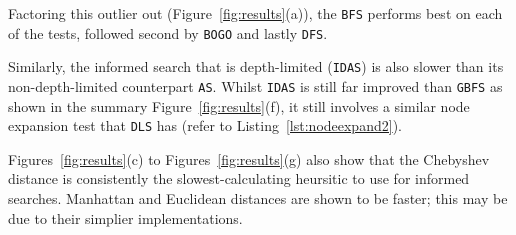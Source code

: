 

Factoring this outlier out (Figure~\ref{fig:results}(a)), the \texttt{BFS} performs
best on each of the tests, followed second by \texttt{BOGO} and lastly \texttt{DFS}.

Similarly, the informed search that is depth-limited (\texttt{IDAS}) is also slower
than its non-depth-limited counterpart \texttt{AS}. Whilst \texttt{IDAS} is still far
improved than \texttt{GBFS} as shown in the summary Figure~\ref{fig:results}(f), it still
involves a similar node expansion test that \texttt{DLS} has (refer to
Listing~\ref{lst:nodeexpand2}).

Figures~\ref{fig:results}(c) to Figures~\ref{fig:results}(g) also show that the Chebyshev
distance is consistently the slowest-calculating heursitic to use for informed
searches. Manhattan and Euclidean distances are shown to be faster; this may
be due to their simplier implementations.

